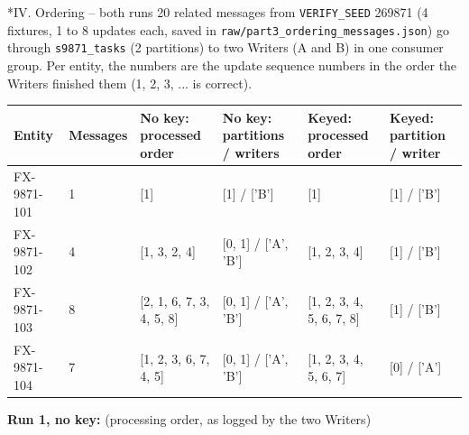 \documentclass[11pt]{article}
\makeatletter
\renewcommand\subsection{\@startsection{subsection}{2}{\z@}{-2.2ex \@plus -1ex \@minus -.2ex}{0.8ex \@plus.2ex}{\normalfont\fontsize{12}{14.5}\selectfont\bfseries}}
\makeatother
\begin{document}
\subsection*{IV. Ordering -- both runs}
20 related messages from \texttt{VERIFY\_\allowbreak{}SEED} 269871 (4 fixtures, 1 to 8 updates each, saved in \texttt{raw/\allowbreak{}part3\_\allowbreak{}ordering\_\allowbreak{}messages.json}) go through \texttt{s9871\_\allowbreak{}tasks} (2 partitions) to two Writers (A and B) in one consumer group. Per entity, the numbers are the update sequence numbers in the order the Writers finished them (1, 2, 3, ... is correct).

\begin{center}
{\scriptsize\setlength{\tabcolsep}{3pt}
\begin{tabular}{p{0.78in}p{0.58in}p{1.4in}p{0.8in}p{1.4in}p{0.7in}}
\toprule
\textbf{Entity} & \textbf{Messages} & \textbf{No key: processed order} & \textbf{No key: partitions / writers} & \textbf{Keyed: processed order} & \textbf{Keyed: partition / writer} \\
\midrule
FX-9871-101 & 1 & [1] & [1] / ['B'] & [1] & [1] / ['B'] \\
FX-9871-102 & 4 & [1, 3, 2, 4] & [0, 1] / ['A', 'B'] & [1, 2, 3, 4] & [1] / ['B'] \\
FX-9871-103 & 8 & [2, 1, 6, 7, 3, 4, 5, 8] & [0, 1] / ['A', 'B'] & [1, 2, 3, 4, 5, 6, 7, 8] & [1] / ['B'] \\
FX-9871-104 & 7 & [1, 2, 3, 6, 7, 4, 5] & [0, 1] / ['A', 'B'] & [1, 2, 3, 4, 5, 6, 7] & [0] / ['A'] \\
\bottomrule
\end{tabular}}
\end{center}
\textbf{Run 1, no key:} (processing order, as logged by the two Writers)
\end{document}
